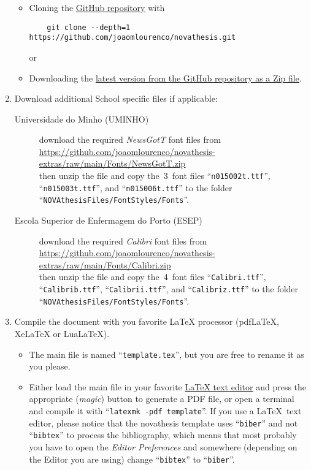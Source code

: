\begin{enumerate}
\begin{itemize}
    \item Cloning the \href{https://github.com/joaomlourenco/novathesis}{GitHub repository} with
    \begin{verbatim}    git clone --depth=1 https://github.com/joaomlourenco/novathesis.git\end{verbatim}%
    or
    \item Downloading the \href{https://github.com/joaomlourenco/novathesis/archive/master.zip}{latest version from the GitHub repository as a Zip file}.
  \end{itemize}
  \item Download additional School specific files if applicable:
  \begin{description}
    \item[Universidade do Minho (UMINHO)] download the required \emph{NewsGotT} font files from\\
    \url{https://github.com/joaomlourenco/novathesis-extras/raw/main/Fonts/NewsGotT.zip}\\
    then unzip the file and copy the~3~font files “\verb!n015002t.ttf!”, “\verb!n015003t.ttf!”, and “\verb!n015006t.ttf!” to the folder “\verb!NOVAthesisFiles/FontStyles/Fonts!”.
    \item[Escola Superior de Enfermagem do Porto (ESEP)] download the required \emph{Calibri} font files from\\
    \url{https://github.com/joaomlourenco/novathesis-extras/raw/main/Fonts/Calibri.zip}\\
    then unzip the file and copy the~4~font files “\verb!Calibri.ttf!”, “\verb!Calibrib.ttf!”, “\verb!Calibrii.ttf!”, and “\verb!Calibriz.ttf!” to the folder “\verb!NOVAthesisFiles/FontStyles/Fonts!”.
  \end{description}
  \item \label{it:project_available} Compile the document with you favorite LaTeX processor (pdfLaTeX, XeLaTeX or LuaLaTeX).  
  \begin{itemize}
    \item The main file is named “\verb!template.tex!”, but you are free to rename it as you please.
    \item Either load the main file in your favorite \href{https://en.wikipedia.org/wiki/Comparison_of_TeX_editors}{LaTeX text editor} and press the appropriate (\emph{magic}) button to generate a PDF file, or open a terminal and compile it with “\verb!latexmk -pdf template!”. If you use a \LaTeX\ text editor, please notice that the \gls{novathesis} template uses “\verb!biber!” and not “\verb!bibtex!” to process the bibliography, which means that most probably you have to open the \emph{Editor Preferences} and somewhere (depending on the Editor you are using) change “\verb!bibtex!” to “\verb!biber!”.

\end{itemize}
\end{enumerate}
